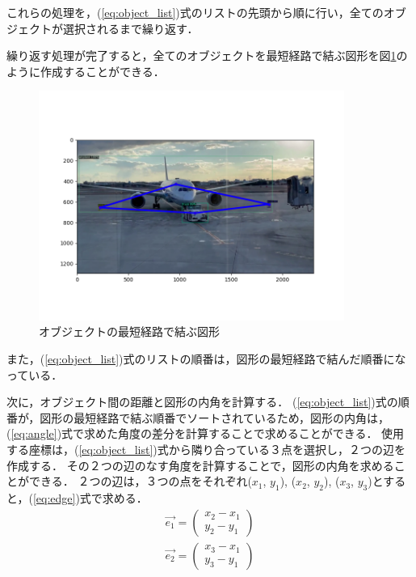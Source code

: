 \documentclass[a4j,12pt,dvipdfmx]{jreport}
\begin{document}
これらの処理を，(\ref{eq:object_list})式のリストの先頭から順に行い，全てのオブジェクトが選択されるまで繰り返す．

繰り返す処理が完了すると，全てのオブジェクトを最短経路で結ぶ図形を図\ref{fig:figure_2}のように作成することができる．

\begin{figure}[htbp]
  \begin{center}
    \includegraphics[width=10cm]{./image/figure_2.png}
    \caption{オブジェクトの最短経路で結ぶ図形}
    \label{fig:figure_2}
  \end{center}
\end{figure}

また，(\ref{eq:object_list})式のリストの順番は，図形の最短経路で結んだ順番になっている．

次に，オブジェクト間の距離と図形の内角を計算する．
(\ref{eq:object_list})式の順番が，図形の最短経路で結ぶ順番でソートされているため，図形の内角は，(\ref{eq:angle})式で求めた角度の差分を計算することで求めることができる．
使用する座標は，(\ref{eq:object_list})式から隣り合っている３点を選択し，２つの辺を作成する．
その２つの辺のなす角度を計算することで，図形の内角を求めることができる．
２つの辺は，３つの点をそれぞれ($x_1$, $y_1$), ($x_2$, $y_2$), ($x_3$, $y_3$)とすると，(\ref{eq:edge})式で求める．
\begin{eqnarray}
  \label{eq:edge}
  \vec{e_1} = \left( \begin{array}{c} x_2-x_1 \\ y_2-y_1 \end{array} \right) \\
  \vec{e_2} = \left( \begin{array}{c} x_3-x_1 \\ y_3-y_1 \end{array} \right)
\end{eqnarray}
\end{document}
